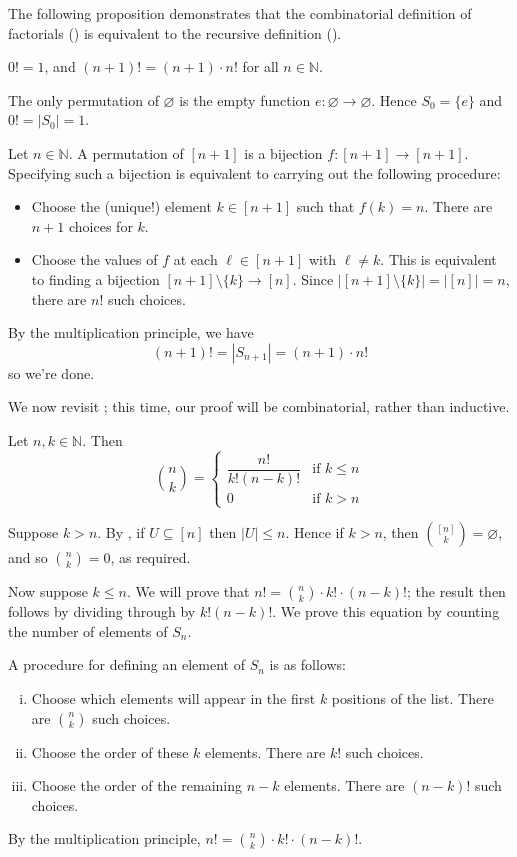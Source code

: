 The following proposition demonstrates that the combinatorial definition of factorials () is equivalent to the recursive definition ().

\begin{theorem}
\label{thmFactorialAsProduct}
$0!=1$, and $(n+1)! = (n+1) \cdot n!$ for all $n \in \mathbb{N}$.
\end{theorem}
\begin{cproof}
The only permutation of $\varnothing$ is the empty function $e : \varnothing \to \varnothing$. Hence $S_0 = \{ e \}$ and $0!=|S_0|=1$.

Let $n \in \mathbb{N}$. A permutation of $[n+1]$ is a bijection $f : [n+1] \to [n+1]$. Specifying such a bijection is equivalent to carrying out the following procedure:
\begin{itemize}
\item Choose the (unique!) element $k \in [n+1]$ such that $f(k) = n$. There are $n+1$ choices for $k$.
\item Choose the values of $f$ at each $\ell \in [n+1]$ with $\ell \ne k$. This is equivalent to finding a bijection $[n+1] \setminus \{ k \} \to [n]$. Since $|[n+1] \setminus \{ k \}| = |[n]| = n$, there are $n!$ such choices.
\end{itemize}
By the multiplication principle, we have
\[ (n+1)! = |S_{n+1}| = (n+1) \cdot n! \]
so we're done.
\end{cproof}

We now revisit ; this time, our proof will be combinatorial, rather than inductive.

\begin{theorem} \label{thmBinomAsFactorial}
Let $n, k \in \mathbb{N}$. Then
\[ \binom{n}{k} = \begin{cases} \dfrac{n!}{k!(n-k)!} & \text{if } k \le n \\ 0 & \text{if } k > n \end{cases} \]
\end{theorem}
\begin{cproof}
Suppose $k>n$. By , if $U \subseteq [n]$ then $|U| \le n$. Hence if $k > n$, then $\binom{[n]}{k} = \varnothing$, and so $\binom{n}{k}=0$, as required.

Now suppose $k \le n$. We will prove that $n! = \binom{n}{k} \cdot k! \cdot (n-k)!$; the result then follows by dividing through by $k!(n-k)!$. We prove this equation by counting the number of elements of $S_n$.

A procedure for defining an element of $S_n$ is as follows:
\begin{enumerate}[(i)]
\item Choose which elements will appear in the first $k$ positions of the list. There are $\binom{n}{k}$ such choices.
\item Choose the order of these $k$ elements. There are $k!$ such choices.
\item Choose the order of the remaining $n-k$ elements. There are $(n-k)!$ such choices.
\end{enumerate}
By the multiplication principle, $n! = \binom{n}{k} \cdot k! \cdot (n-k)!$.
\end{cproof}

